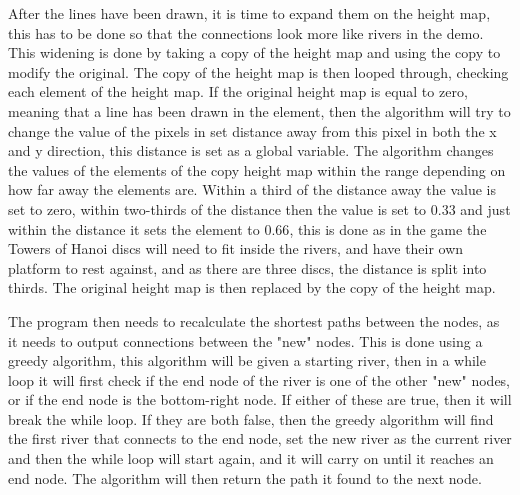 	After the lines have been drawn, it is time to expand them on the height map, this has to be done so that the connections look more like rivers in the demo. This widening is done by taking a copy of the height map and using the copy to modify the original. The copy of the height map is then looped through, checking each element of the height map. If the original height map is equal to zero, meaning that a line has been drawn in the element, then the algorithm will try to change the value of the pixels in set distance away from this pixel in both the x and y direction, this distance is set as a global variable. The algorithm changes the values of the elements of the copy height map within the range depending on how far away the elements are. Within a third of the distance away the value is set to zero, within two-thirds of the distance then the value is set to $0.33$ and just within the distance it sets the element to $0.66$, this is done as in the game the Towers of Hanoi discs will need to fit inside the rivers, and have their own platform to rest against, and as there are three discs, the distance is split into thirds. The original height map is then replaced by the copy of the height map.
	\newline


	\par

	The program then needs to recalculate the shortest paths between the nodes, as it needs to output connections between the "new" nodes. This is done using a greedy algorithm, this algorithm will be given a starting river, then in a while loop it will first check if the end node of the river is one of the other "new" nodes, or if the end node is the bottom-right node. If either of these are true, then it will break the while loop. If they are both false, then the greedy algorithm will find the first river that connects to the end node, set the new river as the current river and then the while loop will start again, and it will carry on until it reaches an end node. The algorithm will then return the path it found to the next node.
	\newline
	\par


